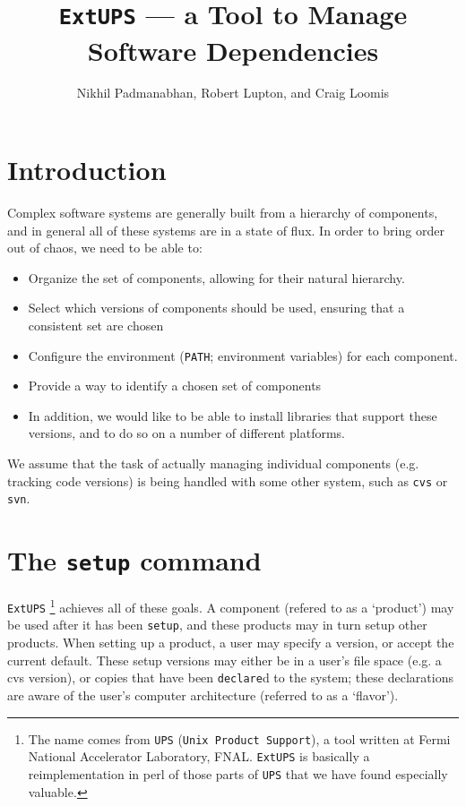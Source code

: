 \documentclass{article}
\newcommand{\code}[1]{\texttt{#1}}
\newcommand{\eups}{\code{ExtUPS}}
\begin{document}
\title{\eups{} --- a Tool to Manage Software Dependencies}
\author{Nikhil Padmanabhan, Robert Lupton, and Craig Loomis}

\maketitle


\section{Introduction}

Complex software systems are generally built from a hierarchy of
components, and in general all of these systems are in a state of
flux.  In order to bring order out of chaos, we need to be able to:
\begin{itemize}
  \item Organize the set of components, allowing for their natural
    hierarchy.

  \item
    Select which versions of components should be used, ensuring
    that a consistent set are chosen

  \item
    Configure the environment (\code{PATH}; environment variables)
    for each component.

  \item
    Provide a way to identify a chosen set of components

  \item
    In addition, we would like to be able to install libraries that support
    these versions, and to do so on a number of different platforms.
\end{itemize}

We assume that the task of actually managing individual components
(e.g. tracking code versions) is being handled with some other system,
such as \code{cvs} or \code{svn}.

\section{The \code{setup} command}

\eups
\footnote{%
  The name comes from \code{UPS} (\code{Unix Product Support}), a
  tool written at Fermi National Accelerator Laboratory, FNAL. \eups{}
  is basically a reimplementation in perl of those parts of \code{UPS}
  that we have found especially valuable.}
achieves all of these goals. A component (refered to as a `product')
may be used after it has been \code{setup}, and these products may
in turn setup other products. When setting up a product, a user
may specify a version, or accept the current default. These setup versions
may either be in a user's file space (e.g. a cvs version), or copies
that have been \code{declare}d to the system; these declarations are
aware of the user's computer architecture (referred to as a `flavor').
\end{document}
